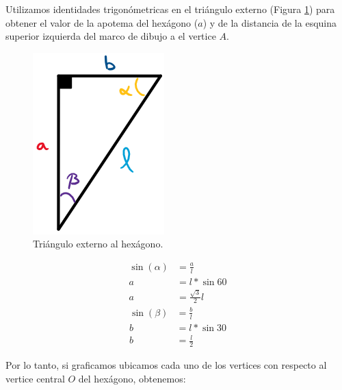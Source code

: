 \documentclass[oneside, a4paper]{article}
\begin{document}
            Utilizamos identidades trigonómetricas en el triángulo externo (Figura \ref{fig:external_triangle_rectangle}) para obtener el valor de la apotema del hexágono ($a$) y de la distancia de la esquina superior izquierda del marco de dibujo a el vertice $A$.

            \begin{figure}[H]
                \centering
                \includegraphics[scale=0.45]{external_triangle_rectangle.png}
                \caption{Triángulo externo al hexágono.}
                \label{fig:external_triangle_rectangle}
            \end{figure}

            \begin{multicols}{2}
                \begin{align}
                    \sin(\alpha) & = \frac{a}{l} \nonumber                          \\
                    a            & = l * \sin{60} \nonumber                         \\
                    a            & = \frac{\sqrt{3}}{2}l \label{eq:apothem_hexagon}
                \end{align}
                \begin{align}
                    \sin(\beta) & = \frac{b}{l} \nonumber                          \\
                    b           & = l * \sin{30} \nonumber                         \\
                    b           & = \frac{l}{2}  \label{eq:base_external_triangle}
                \end{align}
            \end{multicols}

            Por lo tanto, si graficamos ubicamos cada uno de los vertices con respecto al vertice central $O$ del hexágono, obtenemos:
\end{document}
